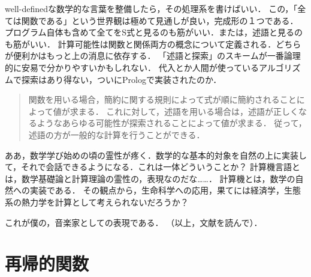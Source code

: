 \documentclass[uplatex, 12pt, dvipdfmx]{jsreport}
\begin{document}
\begin{screen}
well-definedな数学的な言葉を整備したら，その処理系を書けばいい．
この，「全ては関数である」という世界観は極めて見通しが良い，完成形の１つである．
プログラム自体も含めて全てをS式と見るのも筋がいい．または，述語と見るのも筋がいい．
計算可能性は関数と関係両方の概念について定義される．どちらが便利かはもっと上の消息に依存する．
「述語と探索」のスキームが一番論理的に安易で分かりやすいかもしれない．
代入とか人間が使っているアルゴリズムで探索はあり得ない，ついにPrologで実装されたのか．
\begin{quotation}
    関数を用いる場合，簡約に関する規則によって式が順に簡約されることによって値が求まる．
    これに対して，述語を用いる場合は，述語が正しくなるようなあらゆる可能性が探索されることによって値が求まる．
    従って，述語の方が一般的な計算を行うことができる\cite{関数プログラミング}．
\end{quotation}
ああ，数学学び始めの頃の霊性が疼く．数学的な基本的対象を自然の上に実装して，それで会話できるようになる．これは一体どういうことか？
計算機言語とは，数学基礎論と計算理論の霊性の，表現なのだな……．
計算機とは，数学の自然への実装である．
その観点から，生命科学への応用，果てには経済学，生態系の熱力学を計算として考えられないだろうか？

これが僕の，音楽家としての表現である．
（以上，文献\cite{関数プログラミング}を読んで）．
\end{screen}

\section{再帰的関数}
\end{document}

